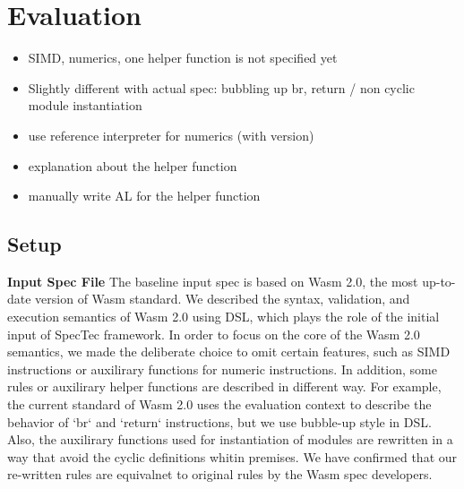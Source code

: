 \section{Evaluation}
\label{sec:eval}

\begin{itemize}
  \item SIMD, numerics, one helper function is not specified yet
  \item Slightly different with actual spec: bubbling up br, return / non cyclic module instantiation
  \item use reference interpreter for numerics (with version)
  \item explanation about the helper function
  \item manually write AL for the helper function
\end{itemize}

\subsection{Setup}

\textbf{Input Spec File}
The baseline input spec is based on Wasm 2.0, the most up-to-date version of
Wasm standard. We described the syntax, validation, and execution semantics of
Wasm 2.0 using DSL, which plays the role of the initial input of SpecTec
framework.  In order to focus on the core of the Wasm 2.0 semantics,  we made
the deliberate choice to omit certain features, such as SIMD instructions or
auxilirary functions for numeric instructions.  In addition, some rules or
auxilirary helper functions are described in different way.  For example, the
current standard of Wasm 2.0 uses the evaluation context to describe the
behavior of `br` and `return` instructions, but we use bubble-up style in DSL.
Also, the auxilirary functions used for instantiation of modules are rewritten
in a way that avoid the cyclic definitions whitin premises. We have confirmed
that our re-written rules are equivalnet to original rules by the Wasm spec
developers.

